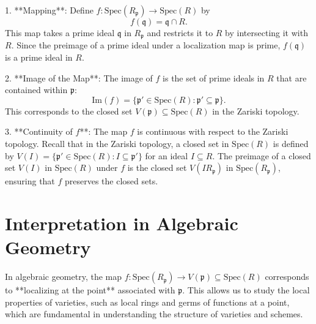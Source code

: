 \documentclass[11pt,openany]{article}
\begin{document}
1. **Mapping**: Define \( f: \text{Spec}(R_{\mathfrak{p}}) \to \text{Spec}(R) \) by
\[
f(\mathfrak{q}) = \mathfrak{q} \cap R.
\]
This map takes a prime ideal \( \mathfrak{q} \) in \( R_{\mathfrak{p}} \) and restricts it to \( R \) by intersecting it with \( R \). Since the preimage of a prime ideal under a localization map is prime, \( f(\mathfrak{q}) \) is a prime ideal in \( R \).

2. **Image of the Map**: The image of \( f \) is the set of prime ideals in \( R \) that are contained within \( \mathfrak{p} \):
\[
\text{Im}(f) = \{ \mathfrak{p}' \in \text{Spec}(R) : \mathfrak{p}' \subseteq \mathfrak{p} \}.
\]
This corresponds to the closed set \( V(\mathfrak{p}) \subseteq \text{Spec}(R) \) in the Zariski topology.

3. **Continuity of \( f \)**: The map \( f \) is continuous with respect to the Zariski topology. Recall that in the Zariski topology, a closed set in \( \text{Spec}(R) \) is defined by \( V(I) = \{ \mathfrak{p}' \in \text{Spec}(R) : I \subseteq \mathfrak{p}' \} \) for an ideal \( I \subseteq R \). The preimage of a closed set \( V(I) \) in \( \text{Spec}(R) \) under \( f \) is the closed set \( V(I R_{\mathfrak{p}}) \) in \( \text{Spec}(R_{\mathfrak{p}}) \), ensuring that \( f \) preserves the closed sets.

\section*{Interpretation in Algebraic Geometry}

In algebraic geometry, the map \( f: \text{Spec}(R_{\mathfrak{p}}) \to V(\mathfrak{p}) \subseteq \text{Spec}(R) \) corresponds to **localizing at the point** associated with \( \mathfrak{p} \). This allows us to study the local properties of varieties, such as local rings and germs of functions at a point, which are fundamental in understanding the structure of varieties and schemes.
\end{document}
